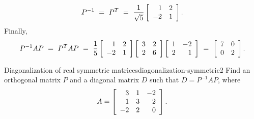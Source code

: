 \documentclass{ximera}
\begin{document}
\begin{solution}
\begin{equation*}
    P^{-1}
    ~=~ P^T
    ~=~ \frac{1}{\sqrt{5}} \startmat{rr} 1 & 2 \\ -2 & 1 \stopmat.
  \end{equation*}
  Finally,
  \begin{equation*}
    P^{-1}AP
    ~=~ P^TAP
    ~=~ \frac{1}{5}
    \startmat{rr} 1 & 2 \\ -2 & 1 \stopmat
    \startmat{rr} 3 & 2 \\ 2 & 6 \stopmat
    \startmat{rr} 1 & -2 \\ 2 & 1 \stopmat
    ~=~ \startmat{rr} 7 & 0 \\ 0 & 2 \stopmat.
  \end{equation*}
\end{solution}

\begin{example}{Diagonalization of real symmetric matrices}{diagonalization-symmetric2}
  Find an orthogonal matrix $P$ and a diagonal matrix $D$ such that $D =
  P^{-1}AP$, where
  \begin{equation*}
    A = \startmat{rrr}
      3  & 1 & -2 \\
      1  & 3 &  2 \\
      -2 & 2 &  0 \\
    \stopmat.
  \end{equation*}
\end{example}
\end{document}

